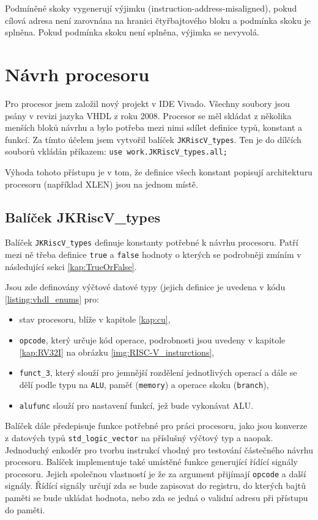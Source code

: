 \documentclass[FM,BP]{tulthesis}
\begin{document}
Podmíněné skoky vygenerují výjimku (instruction-address-misaligned), pokud cílová adresa není zarovnána na hranici čtyřbajtového bloku a podmínka skoku je splněna. Pokud podmínka skoku není splněna, výjimka se nevyvolá.

\chapter{Návrh procesoru}\label{kap:Návrh procesoru}
Pro procesor jsem založil nový projekt v IDE Vivado. Všechny soubory jsou psány v revizi jazyka VHDL z roku 2008. 
Procesor se měl skládat z několika menších bloků návrhu a bylo potřeba mezi nimi sdílet definice typů, konstant a funkcí. Za tímto účelem jsem vytvořil balíček \verb|JKRiscV_types|. Ten je do dílčích souborů vkládán příkazem: 
\verb|use work.JKRiscV_types.all;|

Výhoda tohoto přístupu je v tom, že definice všech konstant popisují architekturu procesoru (například XLEN) jsou na jednom místě.

\section{Balíček JKRiscV\_types}
Balíček \verb|JKRiscV_types| definuje konstanty potřebné k návrhu procesoru. Patří mezi ně třeba definice \verb|true| a \verb|false| hodnoty o kterých se podrobněji zmíním v následující sekci \ref{kap:TrueOrFalse}. 

Jsou zde definovány výčtové datové typy (jejich definice je uvedena v kódu \ref{listing:vhdl_enums} pro:
\begin{itemize}
    \item stav procesoru, blíže v kapitole \ref{kap:cu},
    \item \verb|opcode|, který určuje kód operace, podrobnosti jsou uvedeny v kapitole \ref{kap:RV32I} na obrázku \ref{img:RISC-V_insturctions},
    \item \verb|funct_3|, který slouží pro jemnější rozdělení jednotlivých operací a dále se dělí podle typu na \verb|ALU|, paměť (\verb|memory|) a operace skoku (\verb|branch|),
    \item \verb|alufunc| slouží pro nastavení funkcí, jež bude vykonávat ALU.
\end{itemize}

Balíček dále předepisuje funkce potřebné pro práci procesoru, jako jsou konverze z datových typů \verb|std_logic_vector| na příslušný výčtový typ a naopak. 
Jednoduchý enkodér pro tvorbu instrukcí vhodný pro testování částečného návrhu procesoru. Balíček implementuje také umístěné funkce generující řídící signály procesoru. Jejich společnou vlastností je že za argument přijímají \verb|opcode| a další signály. Řídící signály určují zda se bude zapisovat do registru, do kterých bajtů paměti se bude ukládat hodnota, nebo zda se jedná o validní adresu při přístupu do paměti. 
\end{document}
